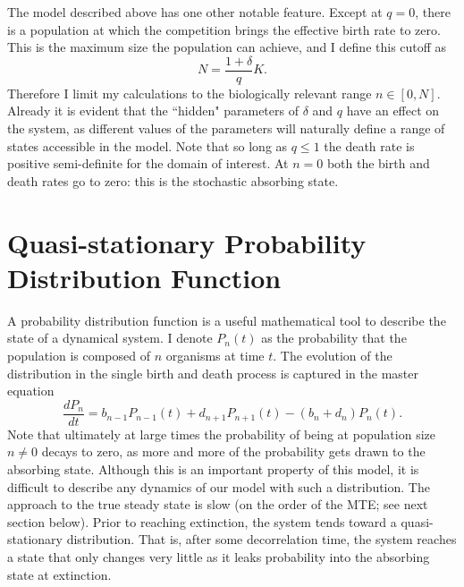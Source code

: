The model described above has one other notable feature. 
Except at $q=0$, there is a population at which the competition brings the effective birth rate to zero. 
This is the maximum size the population can achieve, and I define this cutoff as
\begin{equation}
N = \frac{1+\delta}{q}K. 
\label{maxN}
\end{equation}
Therefore I limit my calculations to the biologically relevant range $n\in[0,N]$. %
Already it is evident that the ``hidden" parameters of $\delta$ and $q$ have an effect on the system, as different values of the parameters will naturally define a range of states accessible in the model. 
Note that so long as $q\leq 1$ the death rate is positive semi-definite for the domain of interest. %
At $n=0$ both the birth and death rates go to zero: this is the stochastic absorbing state. 


\section{Quasi-stationary Probability Distribution Function}%

A probability distribution function is a useful mathematical tool to describe the state of a dynamical system.
I denote $P_n(t)$ as the probability that the population is composed of $n$ organisms at time $t$.
The evolution of the distribution in the single birth and death process is captured in the master equation
\begin{equation}
\frac{dP_n}{dt} =  b_{n-1}P_{n-1}(t) + d_{n+1}P_{n+1}(t) - (b_n+d_n)P_n(t).
\label{master-eqn}
\end{equation}
Note that ultimately at large times the probability of being at population size $n\neq 0$ decays to zero, as more and more of the probability gets drawn to the absorbing state. 
Although this is an important property of this model, it is difficult to describe any dynamics of our model with such a distribution.
The approach to the true steady state is slow (on the order of the MTE; see next section below). 
Prior to reaching extinction, the system tends toward a quasi-stationary distribution. 
That is, after some decorrelation time, the system reaches a state that only changes very little as it leaks probability into the absorbing state at extinction. 

